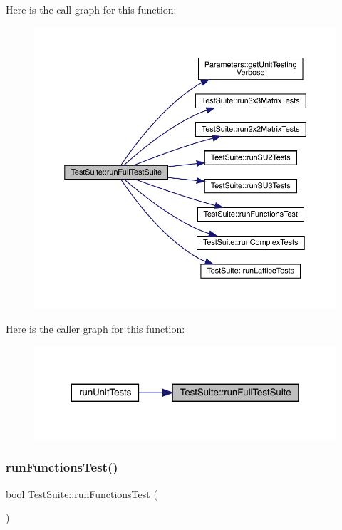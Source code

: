 Here is the call graph for this function\+:\nopagebreak
\begin{figure}[H]
\begin{center}
\leavevmode
\includegraphics[width=350pt]{class_test_suite_a0fa7e788a1b1c235faa475c0d1aaa1e3_cgraph}
\end{center}
\end{figure}
Here is the caller graph for this function\+:\nopagebreak
\begin{figure}[H]
\begin{center}
\leavevmode
\includegraphics[width=322pt]{class_test_suite_a0fa7e788a1b1c235faa475c0d1aaa1e3_icgraph}
\end{center}
\end{figure}
\mbox{\label{class_test_suite_af257c555a7fff6934523f80b9c59309c}} 
\subsubsection{\texorpdfstring{runFunctionsTest()}{runFunctionsTest()}}
{\footnotesize\ttfamily bool Test\+Suite\+::run\+Functions\+Test (\begin{DoxyParamCaption}{ }\end{DoxyParamCaption})}

